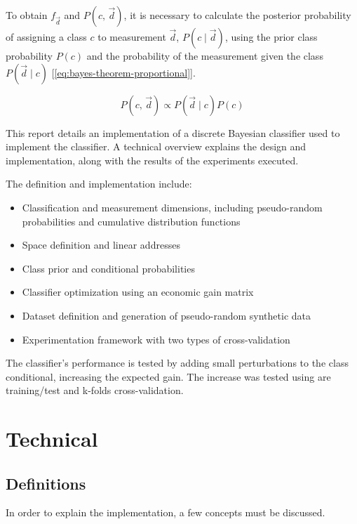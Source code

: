 \documentclass[letterpaper, conference]{IEEEtran}
\begin{document}
To obtain $f_{\vec{d}}$ and $P(c,\, \vec{d})$, it is necessary to calculate the posterior probability of assigning a class $c$ to measurement $\vec{d}$, $P(c \mid \vec{d})$, using the prior class probability $P(c)$ and the probability of the measurement given the class $P(\vec{d} \mid c)$ [\ref{eq:bayes-theorem-proportional}].

\begin{equation} \label{eq:bayes-theorem-proportional}
  P(c,\, \vec{d}) \mathbin{\propto} P(\vec{d} \mid c) \mathbin{} P(c)
\end{equation}

This report details an implementation of a discrete Bayesian classifier used to implement the classifier. A technical overview explains the design and implementation, along with the results of the experiments executed.

The definition and implementation include:

\begin{itemize}
  \item Classification and measurement dimensions, including pseudo-random probabilities and cumulative distribution functions
  \item Space definition and linear addresses
  \item Class prior and conditional probabilities
  \item Classifier optimization using an economic gain matrix
  \item Dataset definition and generation of pseudo-random synthetic data
  \item Experimentation framework with two types of cross-validation
\end{itemize}

The classifier's performance is tested by adding small perturbations to the class conditional, increasing the expected gain. The increase was tested using are training/test and k-folds cross-validation.

\section{Technical}

\subsection{Definitions}

In order to explain the implementation, a few concepts must be discussed.
\end{document}
